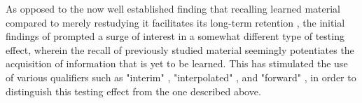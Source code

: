 \documentclass[../main.tex]{subfiles}
\begin{document}
As opposed to the now well established finding that recalling learned material compared to merely restudying it facilitates its long-term retention \cite{roedigeriiiPowerTestingMemory2006, roedigeriiiTestEnhancedLearningTaking2006, rowlandEffectTestingRestudy2014, adesopeRethinkingUseTests2017}, the initial findings of \cite{szpunarTestingStudyInsulates2008} prompted a surge of interest in a somewhat different type of testing effect, wherein the recall of previously studied material seemingly potentiates the acquisition of information that is yet to be learned. This has stimulated the use of various qualifiers such as "interim" \citep{wissmanInterimTestEffect2011}, "interpolated" \citep{szpunarInterpolatedMemoryTests2013}, and "forward" \cite{pastaptterRetrievalPracticeEnhances2014, yangEnhancingLearningRetrieval2018}, in order to distinguish this testing effect from the one described above. 


\cite{}

{
    \biblio
}
\end{document}
